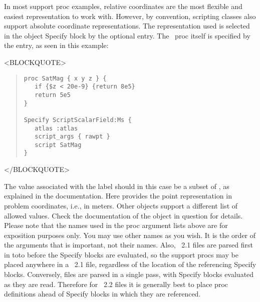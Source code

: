 In most support proc examples, relative coordinates are the most
flexible and easiest representation to work with.  However, by
convention, scripting  classes also support absolute
coordinate representations.  The representation used is selected in the
 object Specify block by the optional 
entry.  The \Tcl\ proc itself is specified by the  entry,
as seen in this example:
\begin{rawhtml}<BLOCKQUOTE>\end{rawhtml}
\begin{quote}
\begin{verbatim}
proc SatMag { x y z } {
   if {$z < 20e-9} {return 8e5}
   return 5e5
}

Specify ScriptScalarField:Ms {
   atlas :atlas
   script_args { rawpt }
   script SatMag
}
\end{verbatim}
\end{quote}
\begin{rawhtml}</BLOCKQUOTE>\end{rawhtml}
The value associated with the label  should in this
case be a subset of , as explained in the
documentation.  Here
 provides the point representation in problem coordinates,
i.e., in meters.  Other  objects support a different list
of allowed  values.  Check the documentation of the
 object in question for details.  Please note that the
names used in the proc argument lists above are for exposition purposes
only.  You may use other names as you wish.  It is the order of the
arguments that is important, not their names.  Also, \MIF~2.1 files are
parsed first in toto before the Specify blocks are evaluated, so the
support procs may be placed anywhere in a \MIF~2.1 file, regardless of
the location of the referencing Specify blocks.  Conversely,
files are parsed in a single pass, with Specify blocks evaluated as they
are read.  Therefore for \MIF~2.2 files it is generally best to place
proc definitions ahead of Specify blocks in which they are referenced.

